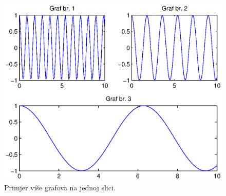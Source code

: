 \documentclass[a4paper, 10pt]{article}
\begin{document}
\begin{figure}[H]
\centering
\includegraphics[width=0.95\linewidth]{slike/subplot.eps}
\caption{Primjer više grafova na jednoj slici.}
\label{fig:subplot}
\end{figure}

\end{document}

